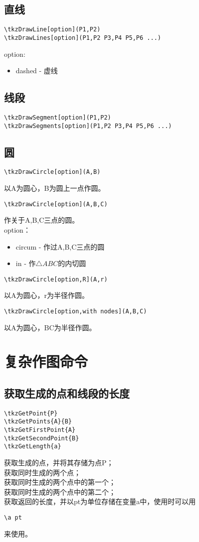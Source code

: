 \documentclass[UTF8]{ctexart}
\begin{document}
\subsection{直线}
\begin{lstlisting}
\tkzDrawLine[option](P1,P2)
\tkzDrawLines[option](P1,P2 P3,P4 P5,P6 ...)
\end{lstlisting}
option:
\begin{itemize}
    \item dashed - 虚线
\end{itemize}
\subsection{线段}
\begin{lstlisting}
\tkzDrawSegment[option](P1,P2)
\tkzDrawSegments[option](P1,P2 P3,P4 P5,P6 ...)
\end{lstlisting}
\subsection{圆}
\begin{lstlisting}
\tkzDrawCircle[option](A,B)
\end{lstlisting}
以A为圆心，B为圆上一点作圆。
\begin{lstlisting}
\tkzDrawCircle[option](A,B,C)
\end{lstlisting}
作关于A,B,C三点的圆。\\
option：
\begin{itemize}
    \item circum - 作过A,B,C三点的圆
    \item in - 作$\triangle ABC$的内切圆
\end{itemize}
\begin{lstlisting}
\tkzDrawCircle[option,R](A,r)
\end{lstlisting}
以A为圆心，r为半径作圆。
\begin{lstlisting}
\tkzDrawCircle[option,with nodes](A,B,C)
\end{lstlisting}
以A为圆心，BC为半径作圆。
\section{复杂作图命令}
\subsection{获取生成的点和线段的长度}
\begin{lstlisting}
\tkzGetPoint{P}
\tkzGetPoints{A}{B}
\tkzGetFirstPoint{A}
\tkzGetSecondPoint{B}
\tkzGetLength{a}
\end{lstlisting}
获取生成的点，并将其存储为点P；\\
获取同时生成的两个点；\\
获取同时生成的两个点中的第一个；\\
获取同时生成的两个点中的第二个；\\
获取返回的长度，并以pt为单位存储在变量a中，使用时可以用
\begin{lstlisting}
\a pt
\end{lstlisting}
来使用。
\end{document}
